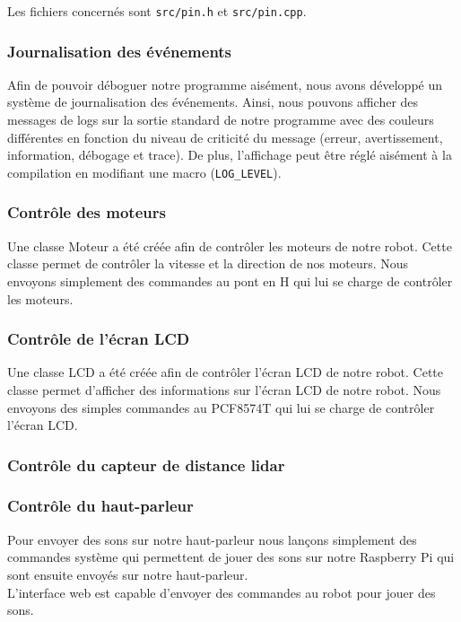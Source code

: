 Les fichiers concernés sont \texttt{src/pin.h} et \texttt{src/pin.cpp}.

\subsubsection{Journalisation des événements}

Afin de pouvoir déboguer notre programme aisément, nous avons développé un système de journalisation des événements.
Ainsi, nous pouvons afficher des messages de logs sur la sortie standard de notre programme avec des couleurs différentes en fonction du niveau de criticité du message (erreur, avertissement, information, débogage et trace).
De plus, l'affichage peut être réglé aisément à la compilation en modifiant une macro (\texttt{LOG\_LEVEL}).

\subsubsection{Contrôle des moteurs}
Une classe Moteur a été créée afin de contrôler les moteurs de notre robot. Cette classe permet de contrôler la vitesse et la direction de nos moteurs.
Nous envoyons simplement des commandes au pont en H qui lui se charge de contrôler les moteurs.

\subsubsection*{Contrôle de l'écran LCD}
Une classe LCD a été créée afin de contrôler l'écran LCD de notre robot. Cette classe permet d'afficher des informations sur l'écran LCD de notre robot.
Nous envoyons des simples commandes au PCF8574T qui lui se charge de contrôler l'écran LCD.

\subsubsection*{Contrôle du capteur de distance lidar}
\todo
\subsubsection*{Contrôle du haut-parleur}

Pour envoyer des sons sur notre haut-parleur nous lançons simplement des commandes système qui permettent de jouer des sons sur notre Raspberry Pi qui sont ensuite envoyés sur notre haut-parleur.
\\
L'interface web est capable d'envoyer des commandes au robot pour jouer des sons.

